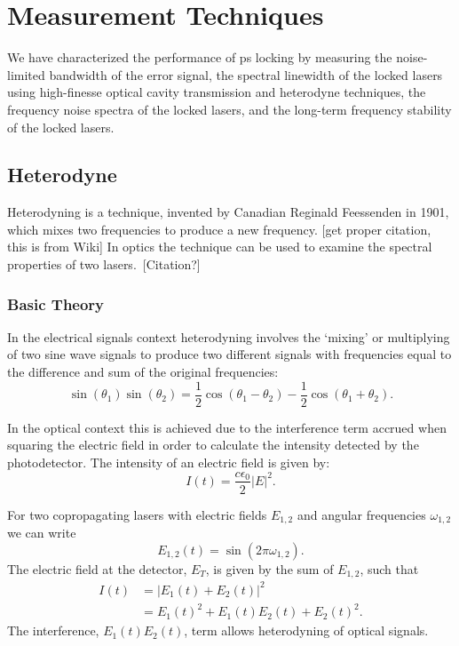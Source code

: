 \chapter{Measurement Techniques}
We have characterized the performance of \gls*{ps} locking by measuring the noise-limited bandwidth of the error signal, the spectral linewidth of the locked lasers using high-finesse optical cavity transmission and heterodyne techniques, the frequency noise spectra of the locked lasers, and the long-term frequency stability of the locked lasers.

\section{Heterodyne}

Heterodyning is a technique, invented by Canadian Reginald Feessenden in 1901, which mixes two frequencies to produce a new frequency. {\color{red} [get proper citation, this is from Wiki]} In optics the technique can be used to examine the spectral properties of two lasers.~{\color{red}[Citation?]}

\subsection{Basic Theory}
In the electrical signals context heterodyning involves the `mixing' or multiplying of two sine wave signals to produce two different signals with frequencies equal to the difference and sum of the original frequencies:
\begin{equation}
\sin(\theta_1)\sin(\theta_2) = \frac{1}{2} \cos(\theta_1-\theta_2) - \frac{1}{2} \cos(\theta_1+\theta_2).
\end{equation}

In the optical context this is achieved due to the interference term accrued when squaring the electric field in order to calculate the intensity detected by the photodetector. The intensity of an electric field is given by:
\begin{equation}
I(t) = \frac{c\epsilon_0}{2}|E|^2.
\end{equation}

For two copropagating lasers with electric fields $E_{1, 2}$ and angular frequencies $\omega_{1, 2}$ we can write
\begin{equation}
E_{1, 2}(t) = \sin(2\pi \omega_{1, 2}).
\end{equation}
The electric field at the detector, $E_T$, is given by the sum of $E_{1,2}$, such that
\begin{align}
I(t) &= |E_1(t) + E_2(t)|^2\nonumber\\
&= E_1(t)^2 + E_1(t)E_2(t) + E_2(t)^2.
\end{align}
The interference, $E_1(t)E_2(t)$, term allows heterodyning of optical signals.

